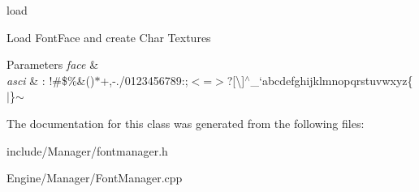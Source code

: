load 

Load Font\+Face and create Char Textures


\begin{DoxyParams}{Parameters}
{\em face} & \\
\hline
{\em asci} & \+: !\#\$\%\&\textquotesingle{}()$\ast$+,-\/./0123456789\+:;$<$=$>$?\mbox{[}\textbackslash{}\mbox{]}$^\wedge$\+\_\+`abcdefghijklmnopqrstuvwxyz\{$\vert$\}$\sim$ \\
\hline
\end{DoxyParams}


The documentation for this class was generated from the following files\+:\begin{DoxyCompactItemize}
\item 
include/\+Manager/fontmanager.\+h\item 
Engine/\+Manager/Font\+Manager.\+cpp\end{DoxyCompactItemize}
